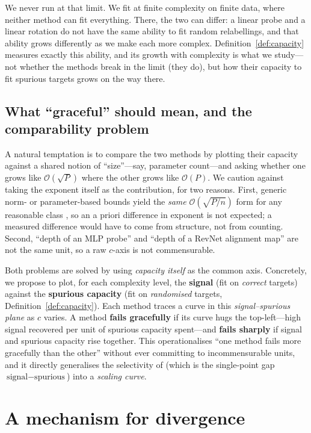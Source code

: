 \documentclass[11pt]{article}
\newcommand{\complexity}{c}              %
\newcommand{\bigO}{\mathcal{O}}
\begin{document}
We never run at that limit. We fit at finite complexity on finite data, where neither
method can fit everything. There, the two can differ: a linear probe and a linear
rotation do not have the same ability to fit random relabellings, and that ability
grows differently as we make each more complex. Definition~\ref{def:capacity} measures
exactly this ability, and its growth with complexity is what we study---not whether
the methods break in the limit (they do), but how their capacity to fit spurious
targets grows on the way there.

\subsection{What ``graceful'' should mean, and the comparability problem}

A natural temptation is to compare the two methods by plotting their capacity
against a shared notion of ``size''---say, parameter count---and asking whether one
grows like $\bigO(\sqrt{P})$ where the other grows like $\bigO(P)$. We caution
against taking the exponent itself as the contribution, for two reasons. First,
generic norm- or parameter-based bounds yield the \emph{same} $\bigO(\sqrt{P/n})$
form for any reasonable class \citep{neyshabur2015norm}, so an a priori difference
in exponent is not expected; a measured difference would have to come from
structure, not from counting. Second, ``depth of an MLP probe'' and ``depth of a
RevNet alignment map'' are not the same unit, so a raw $\complexity$-axis is not
commensurable.

Both problems are solved by using \emph{capacity itself} as the common axis.
Concretely, we propose to plot, for each complexity level, the \textbf{signal}
(fit on \emph{correct} targets) against the \textbf{spurious capacity} (fit on
\emph{randomised} targets, Definition~\ref{def:capacity}). Each method traces a curve in
this \emph{signal--spurious plane} as $\complexity$ varies. A method
\textbf{fails gracefully} if its curve hugs the top-left---high signal recovered
per unit of spurious capacity spent---and \textbf{fails sharply} if signal and
spurious capacity rise together. This operationalises ``one method fails more
gracefully than the other'' without ever committing to incommensurable units, and
it directly generalises the selectivity of \citet{hewitt2019control} (which is the
single-point gap $\text{signal} - \text{spurious}$) into a \emph{scaling curve}.

\section{A mechanism for divergence}\label{sec:mechanism}
\end{document}

